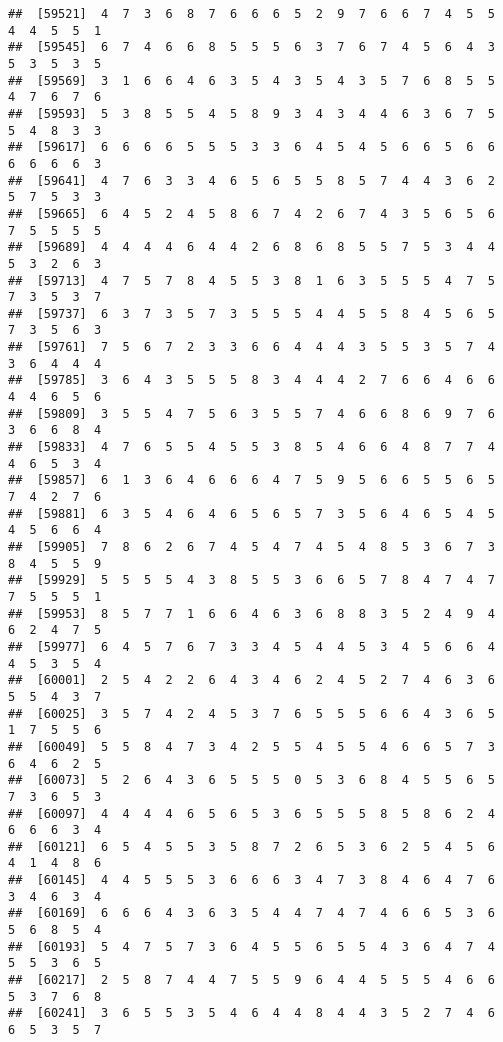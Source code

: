 \documentclass[
]{book}
\begin{document}
\begin{verbatim}
##  [59521]  4  7  3  6  8  7  6  6  6  5  2  9  7  6  6  7  4  5  5  4  4  5  5  1
##  [59545]  6  7  4  6  6  8  5  5  5  6  3  7  6  7  4  5  6  4  3  5  3  5  3  5
##  [59569]  3  1  6  6  4  6  3  5  4  3  5  4  3  5  7  6  8  5  5  4  7  6  7  6
##  [59593]  5  3  8  5  5  4  5  8  9  3  4  3  4  4  6  3  6  7  5  5  4  8  3  3
##  [59617]  6  6  6  6  5  5  5  3  3  6  4  5  4  5  6  6  5  6  6  6  6  6  6  3
##  [59641]  4  7  6  3  3  4  6  5  6  5  5  8  5  7  4  4  3  6  2  5  7  5  3  3
##  [59665]  6  4  5  2  4  5  8  6  7  4  2  6  7  4  3  5  6  5  6  7  5  5  5  5
##  [59689]  4  4  4  4  6  4  4  2  6  8  6  8  5  5  7  5  3  4  4  5  3  2  6  3
##  [59713]  4  7  5  7  8  4  5  5  3  8  1  6  3  5  5  5  4  7  5  7  3  5  3  7
##  [59737]  6  3  7  3  5  7  3  5  5  5  4  4  5  5  8  4  5  6  5  7  3  5  6  3
##  [59761]  7  5  6  7  2  3  3  6  6  4  4  4  3  5  5  3  5  7  4  3  6  4  4  4
##  [59785]  3  6  4  3  5  5  5  8  3  4  4  4  2  7  6  6  4  6  6  4  4  6  5  6
##  [59809]  3  5  5  4  7  5  6  3  5  5  7  4  6  6  8  6  9  7  6  3  6  6  8  4
##  [59833]  4  7  6  5  5  4  5  5  3  8  5  4  6  6  4  8  7  7  4  4  6  5  3  4
##  [59857]  6  1  3  6  4  6  6  6  4  7  5  9  5  6  6  5  5  6  5  7  4  2  7  6
##  [59881]  6  3  5  4  6  4  6  5  6  5  7  3  5  6  4  6  5  4  5  4  5  6  6  4
##  [59905]  7  8  6  2  6  7  4  5  4  7  4  5  4  8  5  3  6  7  3  8  4  5  5  9
##  [59929]  5  5  5  5  4  3  8  5  5  3  6  6  5  7  8  4  7  4  7  7  5  5  5  1
##  [59953]  8  5  7  7  1  6  6  4  6  3  6  8  8  3  5  2  4  9  4  6  2  4  7  5
##  [59977]  6  4  5  7  6  7  3  3  4  5  4  4  5  3  4  5  6  6  4  4  5  3  5  4
##  [60001]  2  5  4  2  2  6  4  3  4  6  2  4  5  2  7  4  6  3  6  5  5  4  3  7
##  [60025]  3  5  7  4  2  4  5  3  7  6  5  5  5  6  6  4  3  6  5  1  7  5  5  6
##  [60049]  5  5  8  4  7  3  4  2  5  5  4  5  5  4  6  6  5  7  3  6  4  6  2  5
##  [60073]  5  2  6  4  3  6  5  5  5  0  5  3  6  8  4  5  5  6  5  7  3  6  5  3
##  [60097]  4  4  4  4  6  5  6  5  3  6  5  5  5  8  5  8  6  2  4  6  6  6  3  4
##  [60121]  6  5  4  5  5  3  5  8  7  2  6  5  3  6  2  5  4  5  6  4  1  4  8  6
##  [60145]  4  4  5  5  5  3  6  6  6  3  4  7  3  8  4  6  4  7  6  3  4  6  3  4
##  [60169]  6  6  6  4  3  6  3  5  4  4  7  4  7  4  6  6  5  3  6  5  6  8  5  4
##  [60193]  5  4  7  5  7  3  6  4  5  5  6  5  5  4  3  6  4  7  4  5  5  3  6  5
##  [60217]  2  5  8  7  4  4  7  5  5  9  6  4  4  5  5  5  4  6  6  5  3  7  6  8
##  [60241]  3  6  5  5  3  5  4  6  4  4  8  4  4  3  5  2  7  4  6  6  5  3  5  7

\end{verbatim}
\end{document}
